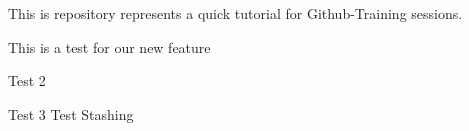
\begin{DoxyItemize}
\item This is repository represents a quick tutorial for Github-\/\+Training sessions.
\item This is a test for our new feature
\item Test 2
\item Test 3 Test Stashing 
\end{DoxyItemize}